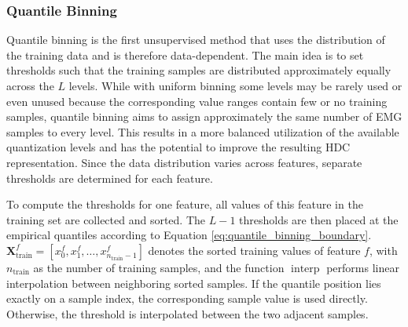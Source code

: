         
        \subsubsection{Quantile Binning}
        \label{sec:quantileBinning}

            Quantile binning is the first unsupervised method that uses the distribution of the training data and is therefore data-dependent. The main idea is to set thresholds such that the training samples are distributed approximately equally across the $L$ levels. While with uniform binning some levels may be rarely used or even unused because the corresponding value ranges contain few or no training samples, quantile binning aims to assign approximately the same number of EMG samples to every level. This results in a more balanced utilization of the available quantization levels and has the potential to improve the resulting HDC representation. Since the data distribution varies across features, separate thresholds are determined for each feature. 

            To compute the thresholds for one feature, all values of this feature in the training set are collected and sorted. The $L-1$ thresholds are then placed at the empirical quantiles according to Equation \ref{eq:quantile_binning_boundary}. $\mathbf{X}^f_{\mathrm{train}}=[x^f_0,x^f_1,\ldots,x^f_{n_{\mathrm{train}}-1}]$ denotes the sorted training values of feature $f$, with $n_{\mathrm{train}}$ as the number of training samples, and the function $\operatorname{interp}$ performs linear interpolation between neighboring sorted samples. If the quantile position lies exactly on a sample index, the corresponding sample value is used directly. Otherwise, the threshold is interpolated between the two adjacent samples.

